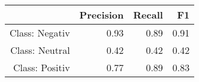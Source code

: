 \begin{table}[ht]
\centering
\begin{tabular}{rrrr}
  \hline
 & Precision & Recall & F1 \\ 
  \hline
Class: Negativ & 0.93 & 0.89 & 0.91 \\ 
  Class: Neutral & 0.42 & 0.42 & 0.42 \\ 
  Class: Positiv & 0.77 & 0.89 & 0.83 \\ 
   \hline
\end{tabular}
\end{table}
